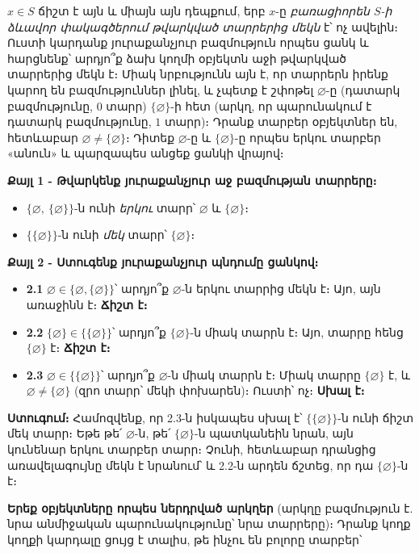 \documentclass[11pt,a4paper]{article}
\begin{document}
\begin{ideabox}
$x\in S$ ճիշտ է այն և միայն այն դեպքում, երբ $x$-ը \emph{բառացիորեն $S$-ի ձևավոր փակագծերում թվարկված տարրերից
մեկն} է՝ ոչ ավելին։ Ուստի կարդանք յուրաքանչյուր բազմություն որպես ցանկ և հարցնենք՝ արդյո՞ք ձախ կողմի
օբյեկտն աջի թվարկված տարրերից մեկն է։ Միակ նրբությունն այն է, որ տարրերն իրենք կարող են բազմություններ
լինել, և չպետք է շփոթել $\varnothing$-ը (դատարկ բազմությունը, $0$ տարր) $\{\varnothing\}$-ի հետ (արկղ,
որ պարունակում է դատարկ բազմությունը, $1$ տարր)։ Դրանք տարբեր օբյեկտներ են, հետևաբար
$\varnothing\neq\{\varnothing\}$։ Դիտեք $\varnothing$-ը և $\{\varnothing\}$-ը որպես երկու տարբեր «անուն» և պարզապես անցեք ցանկի վրայով։
\end{ideabox}

\textbf{Քայլ 1 - Թվարկենք յուրաքանչյուր աջ բազմության տարրերը։}
\begin{itemize}[leftmargin=1.4cm]
\item $\{\varnothing,\ \{\varnothing\}\}$-ն ունի \emph{երկու} տարր՝ $\varnothing$ և $\{\varnothing\}$։
\item $\{\{\varnothing\}\}$-ն ունի \emph{մեկ} տարր՝ $\{\varnothing\}$։
\end{itemize}

\textbf{Քայլ 2 - Ստուգենք յուրաքանչյուր պնդումը ցանկով։}
\begin{itemize}[leftmargin=1.4cm]
\item \textbf{2.1} $\varnothing \in \{\varnothing,\{\varnothing\}\}$՝ արդյո՞ք $\varnothing$-ն երկու
տարրից մեկն է։ Այո, այն առաջինն է։ \textbf{Ճիշտ է։}
\item \textbf{2.2} $\{\varnothing\} \in \{\{\varnothing\}\}$՝ արդյո՞ք $\{\varnothing\}$-ն միակ
տարրն է։ Այո, տարրը հենց $\{\varnothing\}$ է։ \textbf{Ճիշտ է։}
\item \textbf{2.3} $\varnothing \in \{\{\varnothing\}\}$՝ արդյո՞ք $\varnothing$-ն միակ տարրն է։ Միակ
տարրը $\{\varnothing\}$ է, և $\varnothing\neq\{\varnothing\}$ (զրո տարր՝ մեկի փոխարեն)։ Ուստի՝ ոչ։
\textbf{Սխալ է։}
\end{itemize}

\textbf{Ստուգում։} Համոզվենք, որ 2.3-ն իսկապես սխալ է՝ $\{\{\varnothing\}\}$-ն ունի
ճիշտ մեկ տարր։ Եթե թե՛ $\varnothing$-ն, թե՛ $\{\varnothing\}$-ն պատկանեին նրան, այն կունենար երկու
տարբեր տարր։ Չունի, հետևաբար դրանցից առավելագույնը մեկն է նրանում՝ և 2.2-ն արդեն ճշտեց, որ դա
$\{\varnothing\}$-ն է։ \checkmark

\textbf{Երեք օբյեկտները որպես ներդրված արկղեր} (արկղը բազմություն է. նրա անմիջական պարունակությունը՝
նրա տարրերը)։ Դրանք կողք կողքի կարդալը ցույց է տալիս, թե ինչու են բոլորը տարբեր՝
\end{document}
